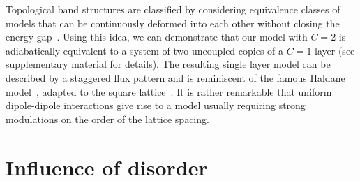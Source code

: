 Topological band structures are classified by considering equivalence classes of models that can be continuously deformed into each other without closing the energy gap~\cite{Hasan2010}.
Using this idea, we can demonstrate that our model with $C=2$ is adiabatically equivalent to a system of two uncoupled copies of a $C=1$ layer (see supplementary material for details).
The resulting single layer model can be described by a staggered flux pattern and is reminiscent of the famous Haldane model~\cite{Haldane1988}, adapted to the square lattice~\cite{Goldman2013,Li2008,Liu2010,Liu2011,Stanescu2010,Wang2011,Wang2014,Yao2012,Yao2013}.
It is rather remarkable that uniform dipole-dipole interactions give rise to a model usually requiring strong modulations on the order of the lattice spacing.



\section{Influence of disorder}

